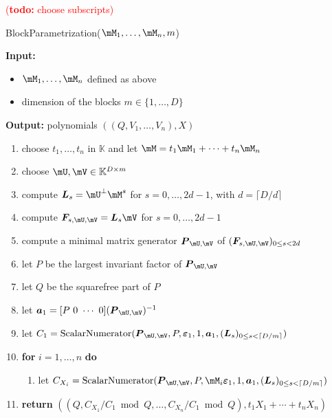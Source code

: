 \documentclass[12pt]{article}
\newcommand{\mat}[1]{\bm{\MakeUppercase{#1}}} %
\newcommand{\row}[1]{\bm{\MakeLowercase{#1}}} %
\newcommand{\col}[1]{\bm{\MakeLowercase{#1}}} %
\newcommand{\seqelt}[1]{\bm{F}_{#1}} %
\newcommand{\todo}[1]{\textcolor{red}{({\bf todo:} #1)}}
\newcommand{\minpoly}{P}
\newcommand{\mainalgoname}{{\sf BlockParametrization}}
\newcommand{\lf}{X}
\def\K{\mathbb{K}}
\def\K {\ensuremath{\mathbb{K}}}
\begin{document}
\todo{choose subscripts}
\begin{algorithm}[H]
	\caption{\mainalgoname($\mM_1,\dots,\mM_n,m$)}
	{\bf Input:} \vspace{-0.5em}
	\begin{itemize}
		\item $\mM_1,\dots,\mM_n$ defined as above
		\item dimension of the blocks $m \in \{1,\dots,D\}$
	\end{itemize}
	{\bf Output:} polynomials $((Q,V_1,\dots,V_n),\lf)$
  \begin{enumerate}
  \item\label{mainstep1}  choose $t_1,\dots,t_n$ in $\K$ and let $\mM = t_1 \mM_1 + \cdots + t_n \mM_n$
  \item\label{mainstep2} { choose $\mU,\mV \in \mathbb{K}^{D \times m}$}
  \item\label{mainstep3} { compute $\mat{L}_s = \mU^{\perp}\mM^s$ for $s=0,\dots,2d-1$, with $d = \lceil D/d \rceil$}
  \item\label{mainstep4} { compute $\seqelt{s,\mU,\mV}= \mat{L}_s\mV$ for $s=0,\dots, 2d-1$}
  \item\label{mainstep5} { compute a minimal matrix generator $\mat{P}_{\mU,\mV}$ of $(\seqelt{s,\mU,\mV})_{0 \le s < 2d}$}
  \item\label{mainstep6} { let $\minpoly$ be the largest invariant factor of $\mat{P}_{\mU,\mV}$}
  \item\label{mainstep7} { let $Q$ be  the squarefree part  of $\minpoly$}
  \item\label{mainstep8} { let $\row{a}_1 = [P~0 ~\cdots~ 0] (\mat{P}_{\mU,\mV})^{-1}$}
  \item\label{mainstep9}  let $C_1 = \mathrm{ScalarNumerator}(\mat{P}_{\mU,\mV}, \minpoly, \col{\varepsilon}_1, 1, \row{a}_1, 
    (\mat{L}_s)_{0 \le s < \lceil D/m \rceil})$
  \item\label{mainstep10} \textbf{for} $i=1,\dots,n$ \textbf{do}
    \begin{enumerate}
     \item let $C_{X_i} = \mathrm{ScalarNumerator}(\mat{P}_{\mU,\mV}, \minpoly, \mM_i\col{\varepsilon}_1, 1, \row{a}_1, 
      (\mat{L}_s)_{0 \le s < \lceil D/m \rceil})$
    \end{enumerate}
\item\label{mainstep11}     \textbf{return} $((Q, C_{X_1}/ C_1 \bmod Q, \dots, C_{X_n}/ C_{1} \bmod Q),t_1 X_1 + \cdots + t_n X_n)$
  \end{enumerate}  \label{algo:block-sparse-fglm}
\end{algorithm}
\end{document}
